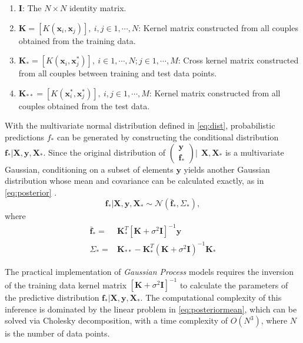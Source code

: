 \begin{enumerate}
      \item $\mathbf{I}$: The $N \times N$ identity matrix.
      \item $\mathbf{K} = [K(\mathbf{x}_i, \mathbf{x}_j)], \ i,j \in 1,\cdots,N$: 
            Kernel matrix constructed from all couples obtained from the training data.
      \item $\mathbf{K}_{*} = [K(\mathbf{x}_i, \mathbf{x}^{*}_j)], \ i \in 1,\cdots,N ; j \in 1,\cdots,M$: 
            Cross kernel matrix constructed from all couples between training and test data points.
      \item $\mathbf{K}_{**} = [K(\mathbf{x}^{*}_i, \mathbf{x}^{*}_j)], \ i,j \in 1,\cdots,M$: 
            Kernel matrix constructed from all couples obtained from the test data.
\end{enumerate}

With the multivariate normal distribution defined in \cref{eq:dist}, probabilistic predictions 
$f_*$ can be generated by constructing the conditional distribution 
$\mathbf{f_*}|\mathbf{X},\mathbf{y},\mathbf{X_*}$. Since the original distribution of 
$\left( \begin{array}{c} \mathbf{y} \\ \mathbf{f_*} \end{array} \right) | \ \ \mathbf{X}, \mathbf{X}_*$ 
is a multivariate Gaussian, conditioning on a subset of elements $\mathbf{y}$ yields another 
Gaussian distribution whose mean and covariance can be calculated exactly, as in 
\cref{eq:posterior} \citep{Rasmussen:2005:GPM:1162254}.
%
\begin{equation}
    \mathbf{f_*}|\mathbf{X},\mathbf{y},\mathbf{X_*} \sim \mathcal{N}(\mathbf{\bar{f}_*}, \Sigma_*)  \label{eq:posterior},
\end{equation}
where
\begin{align}
    \mathbf{\bar{f}_*} = & \mathbf{K}^T_{*} [\mathbf{K} + \sigma^{2} \mathbf{I}]^{-1} \mathbf{y} \label{eq:posteriormean} \\
    \Sigma_* = & \mathbf{K}_{**} - \mathbf{K}^T_{*} \left(\mathbf{K} + \sigma^{2} \mathbf{I}\right)^{-1} \mathbf{K}_{*} \label{eq:posteriorcov}
\end{align}

The practical implementation of \emph{Gaussian Process} models requires the inversion of the 
training data kernel matrix $[\mathbf{K} + \sigma^{2} \mathbf{I}]^{-1}$ to calculate the parameters 
of the predictive distribution $\mathbf{f_*}|\mathbf{X},\mathbf{y},\mathbf{X_*}$. The computational 
complexity of this inference is dominated by the linear problem in \cref{eq:posteriormean}, which 
can be solved via Cholesky decomposition, with a time complexity of $O(N^3)$, where $N$ is the 
number of data points.

